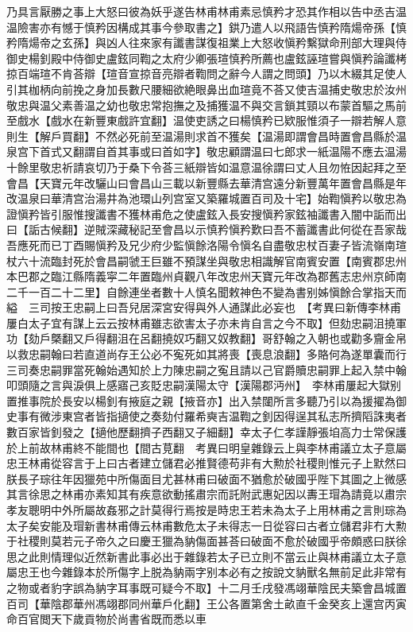 乃具言厭勝之事上大怒曰彼為妖乎遂告林甫林甫素忌慎矜才恐其作相以告中丞吉温温險害亦有憾于慎矜因構成其事今參取書之】鉷乃遣人以飛語告慎矜隋煬帝孫【慎矜隋煬帝之玄孫】與凶人往來家有讖書謀復祖業上大怒收愼矜繫獄命刑部大理與侍御史楊釗殿中侍御史盧鉉同鞫之太府少卿張瑄慎矜所薦也盧鉉誣瑄嘗與愼矜論讖栲掠百端瑄不肯荅辯【瑄音宣掠音亮辯者鞫問之辭今人謂之問頭】乃以木綴其足使人引其枷柄向前挽之身加長數尺腰細欲絶眼鼻出血瑄竟不荅又使吉温捕史敬忠於汝州敬忠與温父素善温之幼也敬忠常抱撫之及捕獲温不與交言鎖其頸以布蒙首驅之馬前至戲水【戲水在新豐東戲許宜翻】温使吏誘之曰楊慎矜已欵服惟須子一辯若解人意則生【解戶買翻】不然必死前至温湯則求首不獲矣【温湯即謂會昌時置會昌縣於温泉宫下首式又翻謂自首其事或曰首如字】敬忠顧謂温曰七郎求一紙温陽不應去温湯十餘里敬忠祈請哀切乃于桑下令荅三紙辯皆如温意温徐謂曰丈人且勿恠因起拜之至會昌【天寶元年改驪山曰會昌山三載以新豐縣去華清宫遠分新豐萬年置會昌縣是年改温泉曰華清宫治湯井為池環山列宫室又築羅城置百司及十宅】始鞫愼矜以敬忠為證愼矜皆引服惟搜讖書不獲林甫危之使盧鉉入長安搜愼矜家鉉袖讖書入闇中詬而出曰【詬古候翻】逆賊深藏秘記至會昌以示慎矜愼矜歎曰吾不蓄讖書此何從在吾家哉吾應死而已丁酉賜愼矜及兄少府少監愼餘洛陽令愼名自盡敬忠杖百妻子皆流嶺南瑄杖六十流臨封死於會昌嗣虢王巨雖不預謀坐與敬忠相識解官南賓安置【南賓郡忠州本巴郡之臨江縣隋義寜二年置臨州貞觀八年改忠州天寶元年改為郡舊志忠州京師南二千一百二十二里】自餘連坐者數十人慎名聞敕神色不變為書别姊愼餘合掌指天而縊　三司按王忠嗣上曰吾兒居深宮安得與外人通謀此必妄也　【考異曰新傳李林甫屢白太子宜有謀上云云按林甫雖志欲害太子亦未肯自言之今不取】但劾忠嗣沮撓軍功【劾戶槩翻又戶得翻沮在呂翻撓奴巧翻又奴教翻】哥舒翰之入朝也或勸多齎金帛以救忠嗣翰曰若直道尚存王公必不寃死如其將喪【喪息浪翻】多賂何為遂單囊而行三司奏忠嗣罪當死翰始遇知於上力陳忠嗣之寃且請以己官爵贖忠嗣罪上起入禁中翰叩頭隨之言與淚俱上感寤己亥貶忠嗣漢陽太守【漢陽郡沔州】　李林甫屢起大獄别置推事院於長安以楊釗有掖庭之親【掖音亦】出入禁闥所言多聽乃引以為援擢為御史事有微涉東宫者皆指擿使之奏劾付羅希奭吉温鞫之釗因得逞其私志所擠䧟誅夷者數百家皆釗發之【擿他歷翻擠子西翻又子細翻】幸太子仁孝謹靜張垍高力士常保護於上前故林甫終不能間也【間古莧翻　考異曰明皇雜錄云上與李林甫議立太子意屬忠王林甫從容言于上曰古者建立儲君必推賢德苟非有大勲於社稷則惟元子上默然曰朕長子琮往年因獵苑中所傷面目尤甚林甫曰破面不猶愈於破國乎陛下其圖之上微感其言徐思之林甫亦素知其有疾意欲動搖肅宗而託附武惠妃因以夀王瑁為請竟以肅宗孝友聰明中外所屬故姦邪之計莫得行焉按是時忠王若未為太子上用林甫之言則琮為太子矣安能及瑁新書林甫傳云林甫數危太子未得志一日從容曰古者立儲君非冇大勲于社稷則莫若元子帝久之曰慶王獵為豽傷面甚荅曰破面不愈於破國乎帝頗惑曰朕徐思之此則情理似近然新書此事必出于雜錄若太子已立則不當云止與林甫議立太子意屬忠王也今雜錄本於所傷字上脱為豽兩字别本必有之按說文豽獸名無前足此非常有之物或者豹字誤為豽字耳事既可疑今不取】十二月壬戌發馮翊華陰民夫築會昌城置百司【華陰郡華州馮翊郡同州華戶化翻】王公各置第舍土畝直千金癸亥上還宫丙寅命百官閲天下歲貢物於尚書省既而悉以車

